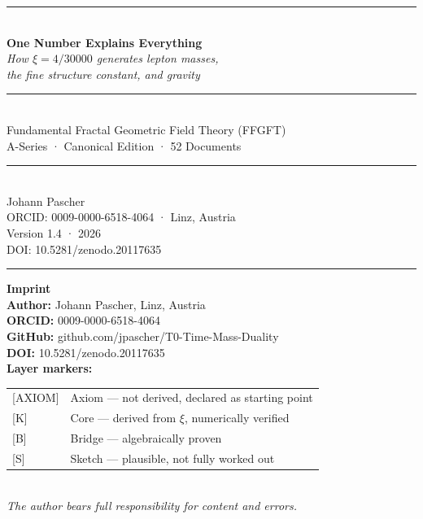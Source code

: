 \documentclass[11pt,twoside,openright]{book}
\begin{document}
\begin{titlepage}
\centering
\vspace*{1.6cm}
{\color{t0blue}\rule{\textwidth}{2pt}}\\[1.2cm]
{\Huge\bfseries\color{t0blue} One Number Explains Everything}\\[0.7cm]
{\large\color{t0orange}\itshape
  How $\xi = 4/30000$ generates lepton masses,\\[0.2em]
  the fine structure constant, and gravity
}\\[1.1cm]
{\color{t0blue}\rule{0.55\textwidth}{0.8pt}}\\[1.0cm]
{\normalsize\color{black}
  Fundamental Fractal Geometric Field Theory (FFGFT)\\[0.2em]
  A-Series · Canonical Edition · 52 Documents
}\\[1.2cm]
{\color{t0blue}\rule{0.55\textwidth}{0.8pt}}\\[1.0cm]
{\large Johann Pascher}\\[0.3cm]
{\small ORCID: 0009-0000-6518-4064 · Linz, Austria}\\[0.2cm]
{\small Version 1.4 · 2026}\\[0.4cm]
{\small DOI: 10.5281/zenodo.20117635}\\[1.2cm]
{\color{t0blue}\rule{\textwidth}{2pt}}
\end{titlepage}

\thispagestyle{empty}
\vspace*{\fill}
{\small
\noindent\textbf{Imprint}\\[0.4em]
\textbf{Author:} Johann Pascher, Linz, Austria\\
\textbf{ORCID:} 0009-0000-6518-4064\\
\textbf{GitHub:} github.com/jpascher/T0-Time-Mass-Duality\\
\textbf{DOI:} 10.5281/zenodo.20117635\\[0.7em]
\textbf{Layer markers:}\\[0.3em]
\begin{tabular}{@{}ll@{}}
{[AXIOM]} & Axiom — not derived, declared as starting point \\[2pt]
{[K]} & Core — derived from $\xi$, numerically verified \\[2pt]
{[B]} & Bridge — algebraically proven \\[2pt]
{[S]} & Sketch — plausible, not fully worked out \\
\end{tabular}\\[0.7em]
\textit{The author bears full responsibility for content and errors.}
}
\clearpage
\end{document}
